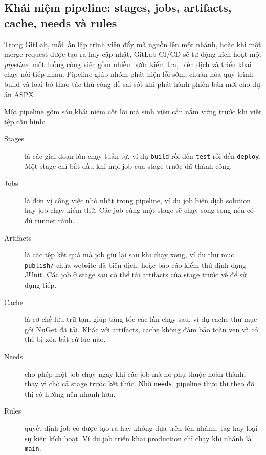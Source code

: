 \subsection{Khái niệm pipeline: stages, jobs, artifacts, cache, needs và rules}

Trong GitLab, mỗi lần lập trình viên đẩy mã nguồn lên một nhánh, hoặc khi một merge
request được tạo ra hay cập nhật, GitLab CI/CD sẽ tự động kích hoạt một \textit{pipeline}:
một luồng công việc gồm nhiều bước kiểm tra, biên dịch và triển khai chạy nối tiếp nhau.
Pipeline giúp nhóm phát hiện lỗi sớm, chuẩn hóa quy trình build và loại bỏ thao tác thủ công
dễ sai sót khi phát hành phiên bản mới cho dự án ASPX \cite{gitlabci}.

Một pipeline gồm sáu khái niệm cốt lõi mà sinh viên cần nắm vững trước khi viết tệp cấu hình:

\begin{description}
\item[Stages] là các giai đoạn lớn chạy tuần tự, ví dụ \verb|build| rồi đến \verb|test| rồi
đến \verb|deploy|. Một stage chỉ bắt đầu khi mọi job của stage trước đã thành công.
\item[Jobs] là đơn vị công việc nhỏ nhất trong pipeline, ví dụ job biên dịch solution hay
job chạy kiểm thử. Các job cùng một stage sẽ chạy song song nếu có đủ runner rảnh.
\item[Artifacts] là các tệp kết quả mà job giữ lại sau khi chạy xong, ví dụ thư mục
\verb|publish/| chứa website đã biên dịch, hoặc báo cáo kiểm thử định dạng JUnit. Các job ở
stage sau có thể tải artifacts của stage trước về để sử dụng tiếp.
\item[Cache] là cơ chế lưu trữ tạm giúp tăng tốc các lần chạy sau, ví dụ cache thư mục gói
NuGet đã tải. Khác với artifacts, cache không đảm bảo toàn vẹn và có thể bị xóa bất cứ lúc nào.
\item[Needs] cho phép một job chạy ngay khi các job mà nó phụ thuộc hoàn thành, thay vì chờ
cả stage trước kết thúc. Nhờ \verb|needs|, pipeline thực thi theo đồ thị có hướng nên nhanh hơn.
\item[Rules] quyết định job có được tạo ra hay không dựa trên tên nhánh, tag hay loại sự kiện
kích hoạt. Ví dụ job triển khai production chỉ chạy khi nhánh là \verb|main|.
\end{description}

